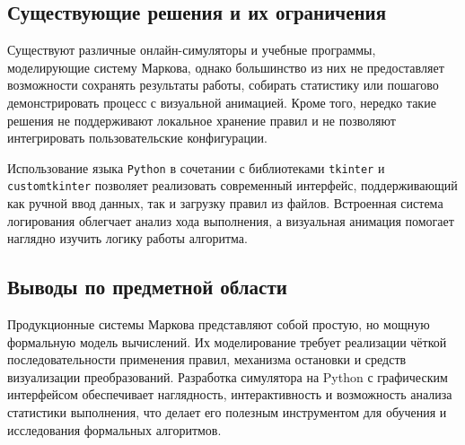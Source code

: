\subsection{Существующие решения и их ограничения}

Существуют различные онлайн-симуляторы и учебные программы, моделирующие систему Маркова, однако большинство из них не предоставляет возможности сохранять результаты работы, собирать статистику или пошагово демонстрировать процесс с визуальной анимацией. Кроме того, нередко такие решения не поддерживают локальное хранение правил и не позволяют интегрировать пользовательские конфигурации.

Использование языка \texttt{Python} в сочетании с библиотеками \texttt{tkinter} и \texttt{customtkinter} позволяет реализовать современный интерфейс, поддерживающий как ручной ввод данных, так и загрузку правил из файлов. Встроенная система логирования облегчает анализ хода выполнения, а визуальная анимация помогает наглядно изучить логику работы алгоритма.

\subsection{Выводы по предметной области}

Продукционные системы Маркова представляют собой простую, но мощную формальную модель вычислений. Их моделирование требует реализации чёткой последовательности применения правил, механизма остановки и средств визуализации преобразований. Разработка симулятора на Python с графическим интерфейсом обеспечивает наглядность, интерактивность и возможность анализа статистики выполнения, что делает его полезным инструментом для обучения и исследования формальных алгоритмов.
